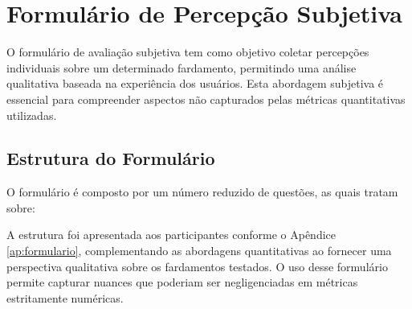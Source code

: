 \chapter{Formulário de Percepção Subjetiva}

O formulário de avaliação subjetiva tem como objetivo coletar percepções individuais sobre um 
determinado fardamento, permitindo uma análise qualitativa baseada na experiência dos usuários. 
Esta abordagem subjetiva é essencial para compreender aspectos não capturados pelas métricas 
quantitativas utilizadas. 

\section{Estrutura do Formulário}
O formulário é composto por um número reduzido de questões, as quais tratam sobre:

A estrutura foi apresentada aos participantes conforme o Apêndice \ref{ap:formulario}, complementando 
as abordagens quantitativas ao fornecer uma perspectiva qualitativa sobre os fardamentos testados. 
O uso desse formulário permite capturar nuances que poderiam ser negligenciadas em métricas 
estritamente numéricas.